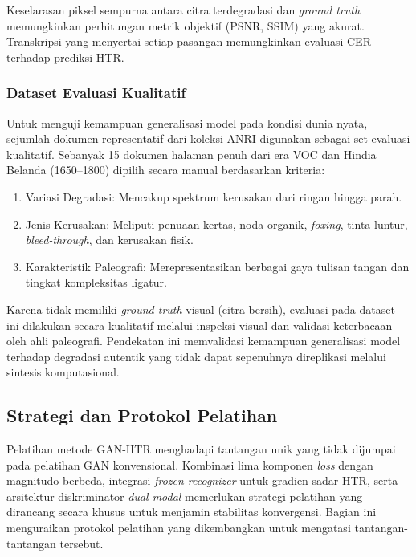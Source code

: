 Keselarasan piksel sempurna antara citra terdegradasi dan \textit{ground truth} memungkinkan perhitungan metrik objektif (PSNR, SSIM) yang akurat. Transkripsi yang menyertai setiap pasangan memungkinkan evaluasi CER terhadap prediksi HTR.

\subsubsection{Dataset Evaluasi Kualitatif}

Untuk menguji kemampuan generalisasi model pada kondisi dunia nyata, sejumlah dokumen representatif dari koleksi ANRI digunakan sebagai set evaluasi kualitatif. Sebanyak 15 dokumen halaman penuh dari era VOC dan Hindia Belanda (1650--1800) dipilih secara manual berdasarkan kriteria:
\begin{enumerate}[label=\alph*., leftmargin=1.5em, labelsep=0.5em, noitemsep]
  \item Variasi Degradasi: Mencakup spektrum kerusakan dari ringan hingga parah.
  \item Jenis Kerusakan: Meliputi penuaan kertas, noda organik, \textit{foxing}, tinta luntur, \textit{bleed-through}, dan kerusakan fisik.
  \item Karakteristik Paleografi: Merepresentasikan berbagai gaya tulisan tangan dan tingkat kompleksitas ligatur.
\end{enumerate}

Karena tidak memiliki \textit{ground truth} visual (citra bersih), evaluasi pada dataset ini dilakukan secara kualitatif melalui inspeksi visual dan validasi keterbacaan oleh ahli paleografi. Pendekatan ini memvalidasi kemampuan generalisasi model terhadap degradasi autentik yang tidak dapat sepenuhnya direplikasi melalui sintesis komputasional.

\subsection{Strategi dan Protokol Pelatihan}
\label{subsec:detail-implementasi-training}

Pelatihan metode GAN-HTR menghadapi tantangan unik yang tidak dijumpai pada pelatihan GAN konvensional. Kombinasi lima komponen \textit{loss} dengan magnitudo berbeda, integrasi \textit{frozen recognizer} untuk gradien sadar-HTR, serta arsitektur diskriminator \textit{dual-modal} memerlukan strategi pelatihan yang dirancang secara khusus untuk menjamin stabilitas konvergensi. Bagian ini menguraikan protokol pelatihan yang dikembangkan untuk mengatasi tantangan-tantangan tersebut.

